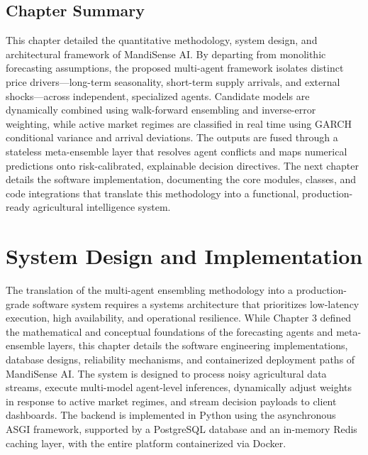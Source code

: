 \documentclass[12pt,a4paper]{report}
\theoremstyle{definition}
\theoremstyle{remark}
\begin{document}
\section{Chapter Summary}

This chapter detailed the quantitative methodology, system design, and architectural framework of MandiSense AI. By departing from monolithic forecasting assumptions, the proposed multi-agent framework isolates distinct price drivers—long-term seasonality, short-term supply arrivals, and external shocks—across independent, specialized agents. Candidate models are dynamically combined using walk-forward ensembling and inverse-error weighting, while active market regimes are classified in real time using GARCH conditional variance and arrival deviations. The outputs are fused through a stateless meta-ensemble layer that resolves agent conflicts and maps numerical predictions onto risk-calibrated, explainable decision directives. The next chapter details the software implementation, documenting the core modules, classes, and code integrations that translate this methodology into a functional, production-ready agricultural intelligence system.


\chapter{System Design and Implementation}

The translation of the multi-agent ensembling methodology into a production-grade software system requires a systems architecture that prioritizes low-latency execution, high availability, and operational resilience. While Chapter 3 defined the mathematical and conceptual foundations of the forecasting agents and meta-ensemble layers, this chapter details the software engineering implementations, database designs, reliability mechanisms, and containerized deployment paths of MandiSense AI. The system is designed to process noisy agricultural data streams, execute multi-model agent-level inferences, dynamically adjust weights in response to active market regimes, and stream decision payloads to client dashboards. The backend is implemented in Python using the asynchronous ASGI framework, supported by a PostgreSQL database and an in-memory Redis caching layer, with the entire platform containerized via Docker.
\end{document}
